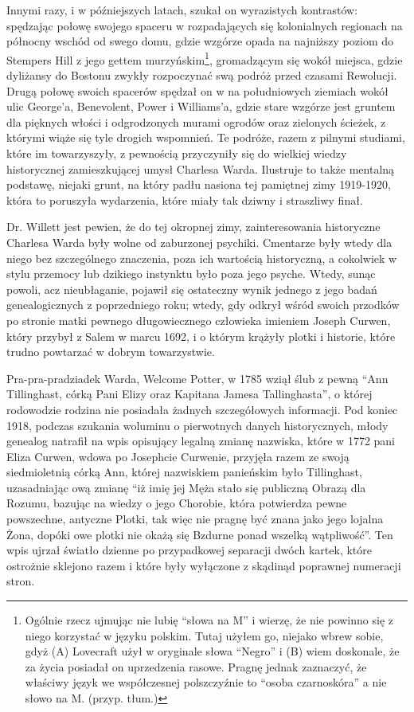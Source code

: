 Innymi razy, i w późniejszych latach, szukał on wyrazistych kontrastów: spędzając połowę swojego spaceru w rozpadających się kolonialnych regionach na północny wschód od swego domu, gdzie wzgórze opada na najniższy poziom do Stempers Hill z jego gettem murzyńskim\footnote{Ogólnie rzecz ujmując nie lubię ``słowa na M'' i wierzę, że nie powinno się z niego korzystać w języku polskim. Tutaj użyłem go, niejako wbrew sobie, gdyż (A) Lovecraft użył w oryginale słowa ``Negro'' i (B) wiem doskonale, że za życia posiadał on uprzedzenia rasowe. Pragnę jednak zaznaczyć, że właściwy język we współczesnej polszczyźnie to ``osoba czarnoskóra'' a nie słowo na M. (przyp. tłum.)}, gromadzącym się wokół miejsca, gdzie dyliżansy do Bostonu zwykły rozpoczynać swą podróż przed czasami Rewolucji. Drugą połowę swoich spacerów spędzał on w na południowych ziemiach wokół ulic George'a, Benevolent, Power i Williams'a, gdzie stare wzgórze jest gruntem dla pięknych włości i odgrodzonych murami ogrodów oraz zielonych ścieżek, z którymi wiąże się tyle drogich wspomnień. Te podróże, razem z pilnymi studiami, które im towarzyszyły, z pewnością przyczyniły się do wielkiej wiedzy historycznej zamieszkującej umysł Charlesa Warda. Ilustruje to także mentalną podstawę, niejaki grunt, na który padłu nasiona tej pamiętnej zimy 1919-1920, która to poruszyła wydarzenia, które miały tak dziwny i straszliwy finał.

Dr. Willett jest pewien, że do tej okropnej zimy, zainteresowania historyczne Charlesa Warda były wolne od zaburzonej psychiki. Cmentarze były wtedy dla niego bez szczególnego znaczenia, poza ich wartością historyczną, a cokolwiek w stylu przemocy lub dzikiego instynktu było poza jego psyche. Wtedy, sunąc powoli, acz nieubłaganie, pojawił się ostateczny wynik jednego z jego badań genealogicznych z poprzedniego roku; wtedy, gdy odkrył wśród swoich przodków po stronie matki pewnego długowiecznego człowieka imieniem Joseph Curwen, który przybył z Salem w marcu 1692, i o którym krążyły plotki i historie, które trudno powtarzać w dobrym towarzystwie.

Pra-pra-pradziadek Warda, Welcome Potter, w 1785 wziął ślub z pewną ``Ann Tillinghast, córką Pani Elizy oraz Kapitana Jamesa Tallinghasta'', o której rodowodzie rodzina nie posiadała żadnych szczegółowych informacji. Pod koniec 1918, podczas szukania woluminu o pierwotnych danych historycznych, młody genealog natrafił na wpis opisujący legalną zmianę nazwiska, które w 1772 pani Eliza Curwen, wdowa po Josephcie Curwenie, przyjęła razem ze swoją siedmioletnią córką Ann, której nazwiskiem panieńskim było Tillinghast, uzasadniając ową zmianę ``iż imię jej Męża stało się publiczną Obrazą dla Rozumu, bazując na wiedzy o jego Chorobie, która potwierdza pewne powszechne, antyczne Plotki, tak więc nie pragnę być znana jako jego lojalna Żona, dopóki owe plotki nie okażą się Bzdurne ponad wszelką wątpliwość''. Ten wpis ujrzał światło dzienne po przypadkowej separacji dwóch kartek, które ostrożnie sklejono razem i które były wyłączone z skądinąd poprawnej numeracji stron.

